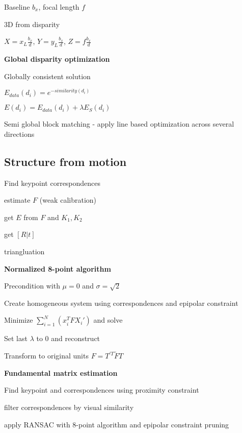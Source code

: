 \documentclass{article}
\begin{document}
\begin{multicols*}{2}
{	Baseline $b_x$, focal length $f$

	3D from disparity

	$X = x_L \frac{b_x}{d}$, $Y = y_L \frac{b_x}{d}$, $Z = f \frac{b_x}{d}$

	\textbf{Global disparity optimization}

	Globally consistent solution

	$E_{data}(d_i) = e^{-similarity(d_i)}$

	$E(d_i) = E_{data}(d_i) + \lambda E_S(d_i)$

	Semi global block matching - apply line based optimization across several directions

	\subsection{Structure from motion}

	\begin{compactenum}
		\item Find keypoint correspondences
		\item estimate $F$ (weak calibration)
		\item get $E$ from $F$ and $K_1, K_2$
		\item get $[R | t]$
		\item triangluation
	\end{compactenum}

	\textbf{Normalized 8-point algorithm}

	\begin{compactenum}
		\item Precondition with $\mu = 0$ and $\sigma = \sqrt{2}$
		\item Create homogeneous system using correspondences and epipolar constraint
		\item Minimize $\sum_{i=1}^{N}(x_i^TFX_i')$ and solve
		\item Set last $\lambda$ to 0 and reconstruct
		\item Transform to original units $F = T^{'T}\tilde{F}T$

	\end{compactenum}

	\textbf{Fundamental matrix estimation}

	\begin{compactenum}
		\item Find keypoint and correspondences using proximity constraint
		\item filter correspondences by visual similarity
		\item apply RANSAC with 8-point algorithm and epipolar constraint pruning


\end{compactenum}}
\end{multicols*}
\end{document}

